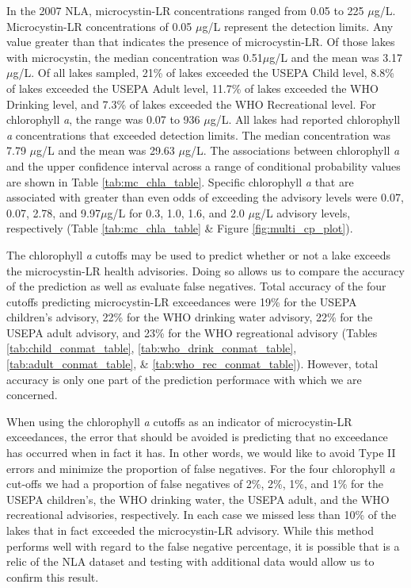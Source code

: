 \documentclass[10pt,a4paper,twocolumn]{article}
\begin{document}
In the 2007 NLA, microcystin-LR concentrations ranged from 0.05 to 225
\(\mu\)g/L. Microcystin-LR concentrations of 0.05 \(\mu\)g/L represent
the detection limits. Any value greater than that indicates the presence
of microcystin-LR. Of those lakes with microcystin, the median
concentration was 0.51\(\mu\)g/L and the mean was 3.17\(\mu\)g/L. Of all
lakes sampled, 21\% of lakes exceeded the USEPA Child level, 8.8\% of
lakes exceeded the USEPA Adult level, 11.7\% of lakes exceeded the WHO
Drinking level, and 7.3\% of lakes exceeded the WHO Recreational level.
For chlorophyll \emph{a}, the range was 0.07 to 936 \(\mu\)g/L. All
lakes had reported chlorophyll \emph{a} concentrations that exceeded
detection limits. The median concentration was 7.79 \(\mu\)g/L and the
mean was 29.63 \(\mu\)g/L. The associations between chlorophyll \emph{a}
and the upper confidence interval across a range of conditional
probability values are shown in Table \ref{tab:mc_chla_table}. Specific
chlorophyll \emph{a} that are associated with greater than even odds of
exceeding the advisory levels were 0.07, 0.07, 2.78, and 9.97\(\mu\)g/L
for 0.3, 1.0, 1.6, and 2.0 \(\mu\)g/L advisory levels, respectively
(Table \ref{tab:mc_chla_table} \& Figure \ref{fig:multi_cp_plot}).

The chlorophyll \emph{a} cutoffs may be used to predict whether or not a
lake exceeds the microcystin-LR health advisories. Doing so allows us to
compare the accuracy of the prediction as well as evaluate false
negatives. Total accuracy of the four cutoffs predicting microcystin-LR
exceedances were 19\% for the USEPA children's advisory, 22\% for the
WHO drinking water advisory, 22\% for the USEPA adult advisory, and 23\%
for the WHO regreational advisory (Tables \ref{tab:child_conmat_table},
\ref{tab:who_drink_conmat_table}, \ref{tab:adult_conmat_table}, \&
\ref{tab:who_rec_conmat_table}). However, total accuracy is only one
part of the prediction performace with which we are concerned.

When using the chlorophyll \emph{a} cutoffs as an indicator of
microcystin-LR exceedances, the error that should be avoided is
predicting that no exceedance has occurred when in fact it has. In other
words, we would like to avoid Type II errors and minimize the proportion
of false negatives. For the four chlorophyll \emph{a} cut-offs we had a
proportion of false negatives of 2\%, 2\%, 1\%, and 1\% for the USEPA
children's, the WHO drinking water, the USEPA adult, and the WHO
recreational advisories, respectively. In each case we missed less than
10\% of the lakes that in fact exceeded the microcystin-LR advisory.
While this method performs well with regard to the false negative
percentage, it is possible that is a relic of the NLA dataset and
testing with additional data would allow us to confirm this result.
\end{document}
